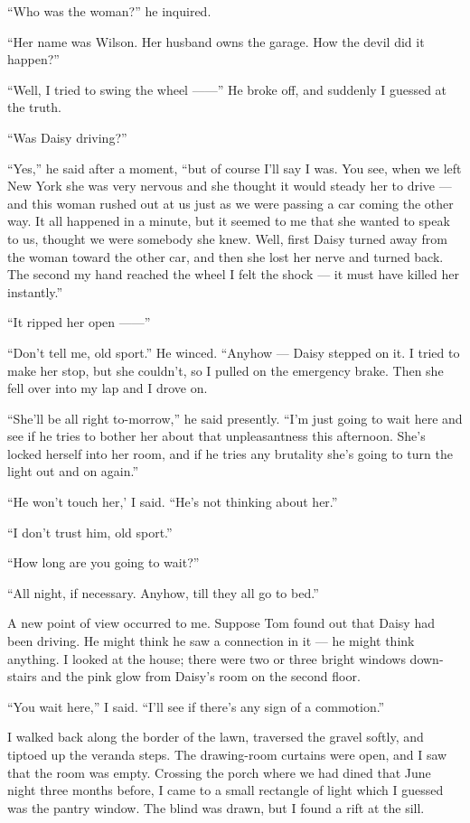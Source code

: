 \documentclass{znotebook}
\begin{document}
``Who was the woman?'' he inquired.

``Her name was Wilson. Her husband owns the garage. How the devil did it happen?''

``Well, I tried to swing the wheel ——'' He broke off, and suddenly I guessed at the truth.

``Was Daisy driving?''

``Yes,'' he said after a moment, ``but of course I’ll say I was. You see, when we left New York she was very nervous and she thought it would steady her to drive — and this woman rushed out at us just as we were passing a car coming the other way. It all happened in a minute, but it seemed to me that she wanted to speak to us, thought we were somebody she knew. Well, first Daisy turned away from the woman toward the other car, and then she lost her nerve and turned back. The second my hand reached the wheel I felt the shock — it must have killed her instantly.''

``It ripped her open ——''

``Don’t tell me, old sport.'' He winced. ``Anyhow — Daisy stepped on it. I tried to make her stop, but she couldn’t, so I pulled on the emergency brake. Then she fell over into my lap and I drove on.

``She’ll be all right to-morrow,'' he said presently. ``I’m just going to wait here and see if he tries to bother her about that unpleasantness this afternoon. She’s locked herself into her room, and if he tries any brutality she’s going to turn the light out and on again.''

``He won’t touch her,’ I said. ``He’s not thinking about her.''

``I don’t trust him, old sport.''

``How long are you going to wait?''

``All night, if necessary. Anyhow, till they all go to bed.''

A new point of view occurred to me. Suppose Tom found out that Daisy had been driving. He might think he saw a connection in it — he might think anything. I looked at the house; there were two or three bright windows down-stairs and the pink glow from Daisy’s room on the second floor.

``You wait here,'' I said. ``I’ll see if there’s any sign of a commotion.''

I walked back along the border of the lawn, traversed the gravel softly, and tiptoed up the veranda steps. The drawing-room curtains were open, and I saw that the room was empty. Crossing the porch where we had dined that June night three months before, I came to a small rectangle of light which I guessed was the pantry window. The blind was drawn, but I found a rift at the sill.
\end{document}
